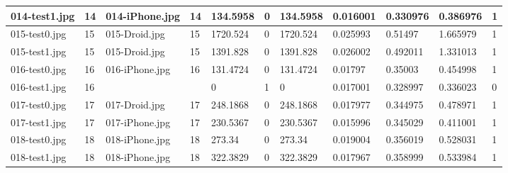 \begin{landscape}
\begin{longtable}{|p{2cm}|p{1cm}|p{2cm}|p{1cm}|p{2cm}|p{1cm}|p{2cm}|p{2cm}|p{2cm}|p{2cm}|p{1cm}|}
	014-test1.jpg   & 14               & 014-iPhone.jpg        & 14                          & 134.5958              & 0                       & 134.5958                   & 0.016001              & 0.330976              & 0.386976                 & 1                \\ \hline
	015-test0.jpg   & 15               & 015-Droid.jpg         & 15                          & 1720.524              & 0                       & 1720.524                   & 0.025993              & 0.51497               & 1.665979                 & 1                \\ \hline
	015-test1.jpg   & 15               & 015-Droid.jpg         & 15                          & 1391.828              & 0                       & 1391.828                   & 0.026002              & 0.492011              & 1.331013                 & 1                \\ \hline
	016-test0.jpg   & 16               & 016-iPhone.jpg        & 16                          & 131.4724              & 0                       & 131.4724                   & 0.01797               & 0.35003               & 0.454998                 & 1                \\ \hline
	016-test1.jpg   & 16               &                       &                             & 0                     & 1                       & 0                          & 0.017001              & 0.328997              & 0.336023                 & 0                \\ \hline
	017-test0.jpg   & 17               & 017-Droid.jpg         & 17                          & 248.1868              & 0                       & 248.1868                   & 0.017977              & 0.344975              & 0.478971                 & 1                \\ \hline
	017-test1.jpg   & 17               & 017-iPhone.jpg        & 17                          & 230.5367              & 0                       & 230.5367                   & 0.015996              & 0.345029              & 0.411001                 & 1                \\ \hline
	018-test0.jpg   & 18               & 018-iPhone.jpg        & 18                          & 273.34                & 0                       & 273.34                     & 0.019004              & 0.356019              & 0.528031                 & 1                \\ \hline
	018-test1.jpg   & 18               & 018-iPhone.jpg        & 18                          & 322.3829              & 0                       & 322.3829                   & 0.017967              & 0.358999              & 0.533984                 & 1                \\ \hline

\end{longtable}
\end{landscape}
